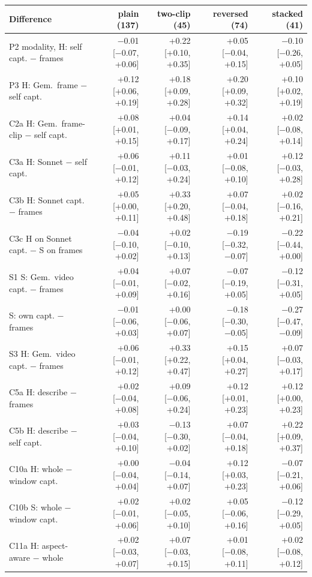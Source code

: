 \documentclass[11pt]{article}
\begin{document}
\begin{table}[t]
\centering
\scriptsize
\setlength{\tabcolsep}{4pt}
\begin{tabular}{@{}lrrrr@{}}
\toprule
Difference & plain (137) & two-clip (45) & reversed (74) & stacked (41) \\
\midrule
P2 modality, H: self capt. − frames & −0.01 [−0.07, +0.06] & +0.22 [+0.10, +0.35] & +0.05 [−0.04, +0.15] & −0.10 [−0.26, +0.05] \\
P3 H: Gem.\ frame − self capt. & +0.12 [+0.06, +0.19] & +0.18 [+0.09, +0.28] & +0.20 [+0.09, +0.32] & +0.10 [+0.02, +0.19] \\
C2a H: Gem.\ frame-clip − self capt. & +0.08 [+0.01, +0.15] & +0.04 [−0.09, +0.17] & +0.14 [+0.04, +0.24] & +0.02 [−0.08, +0.14] \\
C3a H: Sonnet − self capt. & +0.06 [−0.01, +0.12] & +0.11 [−0.03, +0.24] & +0.01 [−0.08, +0.10] & +0.12 [−0.03, +0.28] \\
C3b H: Sonnet capt. − frames & +0.05 [+0.00, +0.11] & +0.33 [+0.20, +0.48] & +0.07 [−0.04, +0.18] & +0.02 [−0.16, +0.21] \\
C3c H on Sonnet capt. − S on frames & −0.04 [−0.10, +0.02] & +0.02 [−0.10, +0.13] & −0.19 [−0.32, −0.07] & −0.22 [−0.44, +0.00] \\
S1 S: Gem.\ video capt. − frames & +0.04 [−0.01, +0.09] & +0.07 [−0.02, +0.16] & −0.07 [−0.19, +0.05] & −0.12 [−0.31, +0.05] \\
S: own capt. − frames & −0.01 [−0.06, +0.03] & +0.00 [−0.06, +0.07] & −0.18 [−0.30, −0.05] & −0.27 [−0.47, −0.09] \\
S3 H: Gem.\ video capt. − frames & +0.06 [−0.01, +0.12] & +0.33 [+0.22, +0.47] & +0.15 [+0.04, +0.27] & +0.07 [−0.03, +0.17] \\
C5a H: describe − frames & +0.02 [−0.04, +0.08] & +0.09 [−0.06, +0.24] & +0.12 [+0.01, +0.23] & +0.12 [+0.00, +0.23] \\
C5b H: describe − self capt. & +0.03 [−0.04, +0.10] & −0.13 [−0.30, +0.02] & +0.07 [−0.04, +0.18] & +0.22 [+0.09, +0.37] \\
C10a H: whole − window capt. & +0.00 [−0.04, +0.04] & −0.04 [−0.14, +0.07] & +0.12 [+0.03, +0.23] & −0.07 [−0.21, +0.06] \\
C10b S: whole − window capt. & +0.02 [−0.01, +0.06] & +0.02 [−0.05, +0.10] & +0.05 [−0.06, +0.16] & −0.12 [−0.29, +0.05] \\
C11a H: aspect-aware − whole & +0.02 [−0.03, +0.07] & +0.07 [−0.03, +0.15] & +0.01 [−0.08, +0.11] & +0.02 [−0.08, +0.12] \\

\end{tabular}
\end{table}
\end{document}
